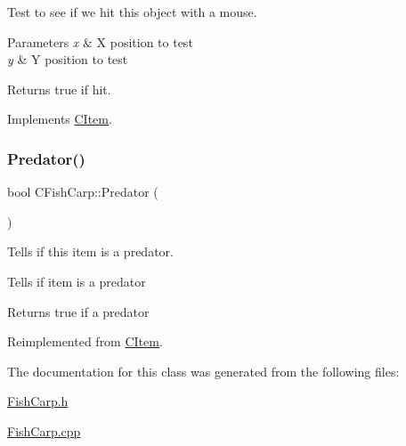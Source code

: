 Test to see if we hit this object with a mouse. 
\begin{DoxyParams}{Parameters}
{\em x} & X position to test \\
\hline
{\em y} & Y position to test \\
\hline
\end{DoxyParams}
\begin{DoxyReturn}{Returns}
true if hit. 
\end{DoxyReturn}


Implements \hyperlink{class_c_item_a8bd4f5e3f2eb2487125dd435719484e8}{C\+Item}.

\mbox{\label{class_c_fish_carp_a16a7a5c00b88e1f2ab3fd2db928bd5aa}} 
\subsubsection{\texorpdfstring{Predator()}{Predator()}}
{\footnotesize\ttfamily bool C\+Fish\+Carp\+::\+Predator (\begin{DoxyParamCaption}{ }\end{DoxyParamCaption})\hspace{0.3cm}{\ttfamily [virtual]}}



Tells if this item is a predator. 

Tells if item is a predator \begin{DoxyReturn}{Returns}
true if a predator 
\end{DoxyReturn}


Reimplemented from \hyperlink{class_c_item_af4f25e99aaf4b27ed6bdc5ff70b75c11}{C\+Item}.



The documentation for this class was generated from the following files\+:\begin{DoxyCompactItemize}
\item 
\hyperlink{_fish_carp_8h}{Fish\+Carp.\+h}\item 
\hyperlink{_fish_carp_8cpp}{Fish\+Carp.\+cpp}\end{DoxyCompactItemize}

